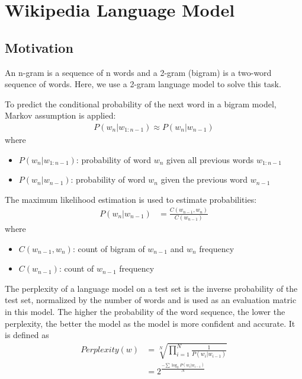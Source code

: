 \section{Wikipedia Language Model}

\subsection{Motivation \cite{n-gram:ch3}}
An n-gram is a sequence of n words and a 2-gram (bigram) is a two-word sequence of words.
Here, we use a 2-gram language model to solve this task.

To predict the conditional probability of the next word in a bigram model, Markov assumption is applied:
\begin{align}
    P(w_n | w_{1:n-1}) \approx P(w_n | w_{n-1})
\end{align}
where
\begin{itemize}
    \item $P(w_n | w_{1:n-1})$: probability of word $w_n$ given all previous words $w_{1:n-1}$
    \item $P(w_n | w_{n-1})$: probability of word $w_n$ given the previous word $w_{n-1}$
\end{itemize}

The maximum likelihood estimation is used to estimate probabilities:
\begin{align}
    P(w_n | w_{n-1}) %
    &=\frac{C(w_{n-1}, w_n)}{C(w_{n-1})}
\end{align}
where
\begin{itemize}
    \item $C(w_{n-1}, w_n)$: count of bigram of $w_{n-1}$ and $w_n$ frequency
    \item $C(w_{n-1})$: count of $w_{n-1}$ frequency
\end{itemize}



The perplexity of a language model on a test set is the inverse probability of the test set, normalized by the number of words and is used as an evaluation matric in this model.
The higher the probability of the word sequence, the lower the perplexity, the better the model as the model is more confident and accurate.
It is defined as 
\begin{align}
    Perplexity(w) &= \sqrt[N]{\prod_{i=1}^{N} \frac{1}{P(w_i | w_{i-1})}} \label{eq:perplexity}\\
    &= 2^{\frac{-\sum \log_2 P(w_i | w_{i-1})}{N}}  \label{eq:perplexity-log}
\end{align}

